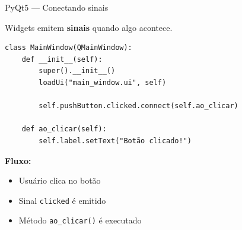 \documentclass{beamer}
\begin{document}
    \begin{frame}[fragile]{PyQt5 — Conectando sinais}
        
        Widgets emitem \textbf{sinais} quando algo acontece.
        
        \vspace{0.3cm}
        
        \begin{verbatim}
class MainWindow(QMainWindow):
    def __init__(self):
        super().__init__()
        loadUi("main_window.ui", self)
    
        self.pushButton.clicked.connect(self.ao_clicar)
    
    def ao_clicar(self):
        self.label.setText("Botão clicado!")
        \end{verbatim}
        
        \vspace{0.3cm}
        
        \textbf{Fluxo:}
        \begin{itemize}
            \item Usuário clica no botão
            \item Sinal \texttt{clicked} é emitido
            \item Método \texttt{ao\_clicar()} é executado
        \end{itemize}
        
    \end{frame}
    
\end{document}

